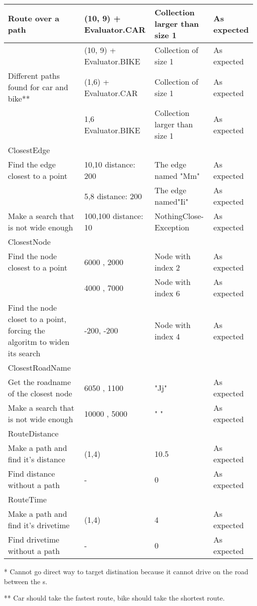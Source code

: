 \begin{centering}
\begin{longtable}{|p{}|p{}|p{}|p{}|}
\hline
Route over a path & (10, 9) + Evaluator.CAR & Collection larger than size 1 & As
expected\\
\hline
 & (10, 9) + Evaluator.BIKE & Collection of size 1 & As
expected\\
\hline
Different paths found for car and bike** & (1,6) + Evaluator.CAR & Collection of
size 1 & As expected\\
\hline
 & 1,6 Evaluator.BIKE & Collection larger than size 1 & As expected\\
\hline
\hline
ClosestEdge & & & \\
\hline
Find the edge closest to a point & 10,10 distance: 200 & The edge named "Mm" &
As expected\\
\hline
 & 5,8 distance: 200 & The edge named"Ii" & As expected\\
\hline
Make a search that is not wide enough & 100,100 distance: 10 &
NothingClose-Exception & As expected\\
\hline
\hline
ClosestNode & & & \\
\hline
Find the node closest to a point & 6000 , 2000 & Node with index 2 & As
expected\\
\hline
 & 4000 , 7000 & Node with index 6 & As expected\\
\hline
Find the node closet to a point, forcing the algoritm to widen its search &
-200, -200 & Node with index 4 & As expected\\
\hline
\hline
ClosestRoadName & & & \\
\hline
Get the roadname of the closest node & 6050 , 1100 & "Jj" & As expected\\
\hline
Make a search that is not wide enough & 10000 , 5000 & " " & As expected\\
\hline
\hline
RouteDistance & & & \\
\hline
Make a path and find it's distance & (1,4) & 10.5 & As expected\\
\hline
Find distance without a path & - & 0 & As expected\\
\hline
\hline
RouteTime & & & \\
\hline
Make a path and find it's drivetime & (1,4) & 4 & As expected\\
\hline
Find drivetime without a path & - & 0 & As expected\\
\hline
\end{longtable}
\end{centering}

* Cannot go direct way to target distination because it cannot drive on the road
between the s.

** Car should take the fastest route, bike should take the shortest route.